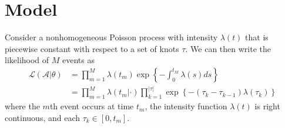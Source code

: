\documentclass[11pt]{article}
\begin{document}
\section{Model}

Consider a nonhomogeneous Poisson process with  intensity $\lambda(t)$ that is piecewise constant with respect to a set of knots $\tau$.  We can then write the likelihood of $M$ events as
\begin{align}
\mathcal{L}(\mathcal{A}|\theta) &= \prod_{m=1}^M \lambda(t_m) \exp\left\{ - \int_{0}^{t_M} \lambda(s)ds \right\} \\
&= \prod_{m=1}^M \lambda(t_m|\cdot) \prod_{k=1}^{|\tau|} \exp\left\{ - (\tau_{k} - \tau_{k-1}) \lambda(\tau_k) \right\}
\end{align}
\noindent where the $m$th event occurs at time $t_m$, the intensity function $\lambda(t)$ is right continuous, and each $\tau_k \in [0,t_m]$.
\end{document}
